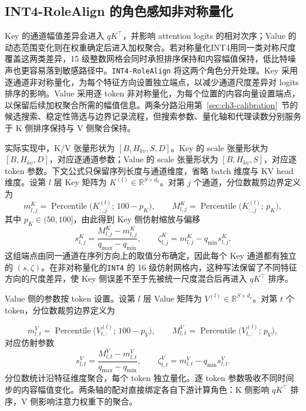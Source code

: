 \subsection{INT4-RoleAlign 的角色感知非对称量化}
\label{subsec:ch3-rolealign}

Key 的通道幅值差异会进入 $qK^\top$，并影响 attention logits 的相对次序；Value 的动态范围变化则在权重确定后进入加权聚合。若对称量化INT4用同一类对称尺度覆盖这两类差异，15 级整数网格会同时承担排序保持和内容幅值保持，低比特噪声也更容易落到敏感路径中。\texttt{INT4-RoleAlign} 将这两个角色分开处理。Key 采用逐通道非对称量化，为每个特征方向设置独立端点，以减少通道尺度差异对 logits 排序的影响。Value 采用逐 token 非对称量化，为每个位置的内容向量设置端点，以保留后续加权聚合所需的幅值信息。两条分路沿用第~\ref{sec:ch3-calibration}~节的候选搜索、稳定性筛选与边界记录流程，但搜索参数、量化轴和代理读数分别服务于 K 侧排序保持与 V 侧聚合保持。

实际实现中，K/V 张量形状为 $[B,H_{kv},S,D]$。Key 的 scale 张量形状为 $[B,H_{kv},D]$，对应逐通道参数；Value 的 scale 张量形状为 $[B,H_{kv},S]$，对应逐 token 参数。下文公式只保留序列长度与通道维度，省略 batch 维度与 KV head 维度。设第 $l$ 层 Key 矩阵为 $K^{(l)}\in\mathbb{R}^{S\times d_k}$。对第 $j$ 个通道，分位数裁剪边界定义为
\begin{equation}
m_{l,j}^{K}
=
\operatorname{Percentile}\!\big(K^{(l)}_{:,j};\,100-p_K\big),
\qquad
M_{l,j}^{K}
=
\operatorname{Percentile}\!\big(K^{(l)}_{:,j};\,p_K\big),
\end{equation}
其中 $p_K\in(50, 100]$，由此得到 Key 侧仿射缩放与偏移
\begin{equation}
s_{l,j}^{K}
=
\frac{M_{l,j}^{K}-m_{l,j}^{K}}{q_{\max}-q_{\min}},
\qquad
\zeta_{l,j}^{K}
=
m_{l,j}^{K}-q_{\min}s_{l,j}^{K}.
\end{equation}
这组端点由同一通道在序列方向上的取值分布确定，因此每个 Key 通道都有独立的 $(s,\zeta)$。在非对称量化的\texttt{INT4} 的 16 级仿射网格内，这种写法保留了不同特征方向的尺度差异，使 Key 侧误差不至于先被统一尺度混合后再进入 $qK^\top$ 排序。

Value 侧的参数按 token 设置。设第 $l$ 层 Value 矩阵为 $V^{(l)}\in\mathbb{R}^{S\times d_v}$。对第 $t$ 个 token，分位数裁剪边界定义为

\begin{equation}
m_{l,t}^{V}
=
\operatorname{Percentile}\!\big(V^{(l)}_{t,:};\,100-p_V\big),
\qquad
M_{l,t}^{V}
=
\operatorname{Percentile}\!\big(V^{(l)}_{t,:};\,p_V\big),
\end{equation}
对应仿射参数
\begin{equation}
s_{l,t}^{V}
=
\frac{M_{l,t}^{V}-m_{l,t}^{V}}{q_{\max}-q_{\min}},
\qquad
\zeta_{l,t}^{V}
=
m_{l,t}^{V}-q_{\min}s_{l,t}^{V}.
\end{equation}
分位数统计沿特征维度聚合，每个 token 独立量化。逐 token 参数吸收不同时间步的内容幅值变化。两条轴的配对直接绑定各自下游计算角色：K 侧影响 $qK^\top$ 排序，V 侧影响注意力权重下的聚合。

